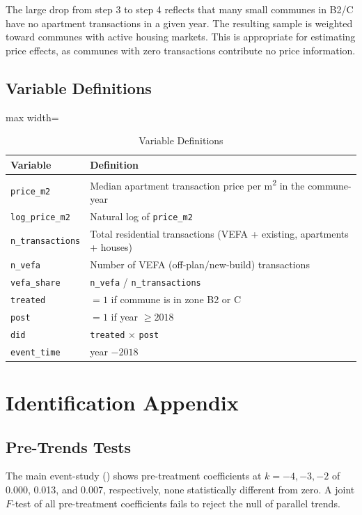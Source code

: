 \documentclass[12pt]{article}
\begin{document}
The large drop from step 3 to step 4 reflects that many small communes in B2/C have no apartment transactions in a given year. The resulting sample is weighted toward communes with active housing markets. This is appropriate for estimating price effects, as communes with zero transactions contribute no price information.

\subsection{Variable Definitions}

\begin{table}[H]
\centering
\caption{Variable Definitions}
\begin{adjustbox}{max width=\textwidth}
\begin{tabular}{lp{10cm}}
\toprule
Variable & Definition \\
\midrule
\texttt{price\_m2} & Median apartment transaction price per m\textsuperscript{2} in the commune-year \\
\texttt{log\_price\_m2} & Natural log of \texttt{price\_m2} \\
\texttt{n\_transactions} & Total residential transactions (VEFA + existing, apartments + houses) \\
\texttt{n\_vefa} & Number of VEFA (off-plan/new-build) transactions \\
\texttt{vefa\_share} & \texttt{n\_vefa} / \texttt{n\_transactions} \\
\texttt{treated} & $= 1$ if commune is in zone B2 or C \\
\texttt{post} & $= 1$ if year $\geq 2018$ \\
\texttt{did} & \texttt{treated} $\times$ \texttt{post} \\
\texttt{event\_time} & year $- 2018$ \\
\bottomrule
\end{tabular}
\end{adjustbox}
\end{table}


\section{Identification Appendix}\label{app:id}

\subsection{Pre-Trends Tests}

The main event-study () shows pre-treatment coefficients at $k = -4, -3, -2$ of 0.000, 0.013, and 0.007, respectively, none statistically different from zero. A joint $F$-test of all pre-treatment coefficients fails to reject the null of parallel trends.
\end{document}
